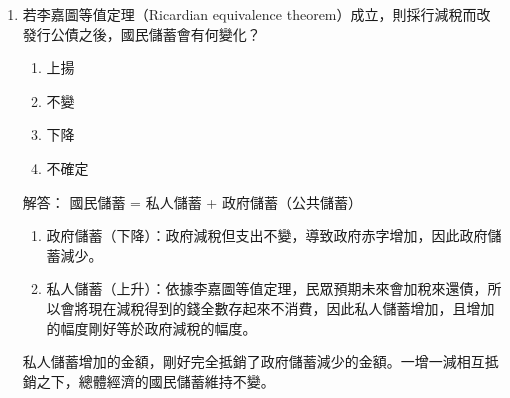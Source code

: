 \documentclass[12pt, a4paper]{article}
\begin{document}
\begin{enumerate}
    根據《公共債務法》第 5 條第 10 項規定：「直轄市、縣（市）及鄉（鎮、市）為調節庫款收支所舉借之未滿一年公共債務未償餘額，不得超過其當年度總預算及特別預算歲出總額百分之三十。」

    計算歲出總額：當年度總預算（110 億元）＋ 當年度特別預算（25 億元）＝ 135 億元。
    計算未滿一年債務上限： 歲出總額 $\times$ 30\%
    \[
    135 \text{億元} \times 30\% = 40.5 \text{ 億元}
    \]


    \item 若李嘉圖等值定理（Ricardian equivalence theorem）成立，則採行減稅而改發行公債之後，國民儲蓄會有何變化？
    \begin{enumerate}[label=\Alph*.]
        \item 上揚
        \item 不變
        \item 下降
        \item 不確定
    \end{enumerate}
    解答：
    國民儲蓄 = 私人儲蓄 + 政府儲蓄（公共儲蓄）
	\begin{enumerate}[1.]
	    \item 政府儲蓄（下降）：政府減稅但支出不變，導致政府赤字增加，因此政府儲蓄減少。
        \item 私人儲蓄（上升）：依據李嘉圖等值定理，民眾預期未來會加稅來還債，所以會將現在減稅得到的錢全數存起來不消費，因此私人儲蓄增加，且增加的幅度剛好等於政府減稅的幅度。
	\end{enumerate}
    私人儲蓄增加的金額，剛好完全抵銷了政府儲蓄減少的金額。一增一減相互抵銷之下，總體經濟的國民儲蓄維持不變。

\end{enumerate}
\end{document}

